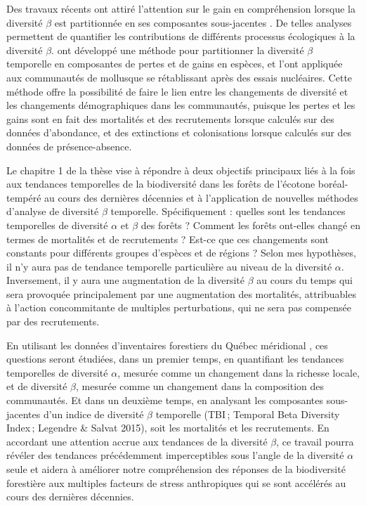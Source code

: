 Des travaux récents ont attiré l'attention sur le gain en compréhension
lorsque la diversité \(\beta\) est partitionnée en ses composantes
sous-jacentes
\citep{baselga_partitioning_2010, podani_general_2013, legendre_interpreting_2014, legendre_temporal_2019}.
De telles analyses permettent de quantifier les contributions de
différents processus écologiques à la diversité \(\beta\).
\citet{legendre_thirty-year_2015} ont développé une méthode pour
partitionner la diversité \(\beta\) temporelle en composantes de pertes
et de gains en espèces, et l'ont appliquée aux communautés de mollusque
se rétablissant après des essais nucléaires. Cette méthode offre la
possibilité de faire le lien entre les changements de diversité et les
changements démographiques dans les communautés, puisque les pertes et
les gains sont en fait des mortalités et des recrutements lorsque
calculés sur des données d'abondance, et des extinctions et
colonisations lorsque calculés sur des données de présence-absence.

Le chapitre 1 de la thèse vise à répondre à deux objectifs principaux
liés à la fois aux tendances temporelles de la biodiversité dans les
forêts de l'écotone boréal-tempéré au cours des dernières décennies et à
l'application de nouvelles méthodes d'analyse de diversité \(\beta\)
temporelle. Spécifiquement : quelles sont les tendances temporelles de
diversité \(\alpha\) et \(\beta\) des forêts ? Comment les forêts
ont-elles changé en termes de mortalités et de recrutements ? Est-ce que
ces changements sont constants pour différents groupes d'espèces et de
régions ? Selon mes hypothèses, il n'y aura pas de tendance temporelle
particulière au niveau de la diversité \(\alpha\). Inversement, il y
aura une augmentation de la diversité \(\beta\) au cours du temps qui
sera provoquée principalement par une augmentation des mortalités,
attribuables à l'action concommitante de multiples perturbations, qui ne
sera pas compensée par des recrutements.

En utilisant les données d'inventaires forestiers du Québec méridional
\citep{mffp_placettes-echantillons_2016}, ces questions seront étudiées,
dans un premier temps, en quantifiant les tendances temporelles de
diversité \(\alpha\), mesurée comme un changement dans la richesse
locale, et de diversité \(\beta\), mesurée comme un changement dans la
composition des communautés. Et dans un deuxième temps, en analysant les
composantes sous-jacentes d'un indice de diversité \(\beta\) temporelle
(TBI\,; Temporal Beta Diversity Index\,; Legendre \& Salvat 2015), soit
les mortalités et les recrutements. En accordant une attention accrue
aux tendances de la diversité \(\beta\), ce travail pourra révéler des
tendances précédemment imperceptibles sous l'angle de la diversité
\(\alpha\) seule et aidera à améliorer notre compréhension des réponses
de la biodiversité forestière aux multiples facteurs de stress
anthropiques qui se sont accélérés au cours des dernières décennies.

